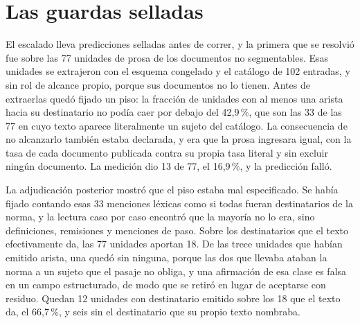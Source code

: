 \documentclass[12pt,a4paper]{report}
\begin{document}



\section{Las guardas selladas}
\label{sec:guardas}

El escalado lleva predicciones selladas antes de correr, y la primera que se resolvió fue sobre las 77 unidades de prosa de los documentos no segmentables. Esas unidades se extrajeron con el esquema congelado y el catálogo de 102 entradas, y sin rol de alcance propio, porque sus documentos no lo tienen. Antes de extraerlas quedó fijado un piso: la fracción de unidades con al menos una arista hacia su destinatario no podía caer por debajo del 42,9\,\%, que son las 33 de las 77 en cuyo texto aparece literalmente un sujeto del catálogo. La consecuencia de no alcanzarlo también estaba declarada, y era que la prosa ingresara igual, con la tasa de cada documento publicada contra su propia tasa literal y sin excluir ningún documento. La medición dio 13 de 77, el 16,9\,\%, y la predicción falló.

La adjudicación posterior mostró que el piso estaba mal especificado. Se había fijado contando esas 33 menciones léxicas como si todas fueran destinatarios de la norma, y la lectura caso por caso encontró que la mayoría no lo era, sino definiciones, remisiones y menciones de paso. Sobre los destinatarios que el texto efectivamente da, las 77 unidades aportan 18. De las trece unidades que habían emitido arista, una quedó sin ninguna, porque las dos que llevaba ataban la norma a un sujeto que el pasaje no obliga, y una afirmación de esa clase es falsa en un campo estructurado, de modo que se retiró en lugar de aceptarse con residuo. Quedan 12 unidades con destinatario emitido sobre los 18 que el texto da, el 66,7\,\%, y seis sin el destinatario que su propio texto nombraba.
\end{document}
